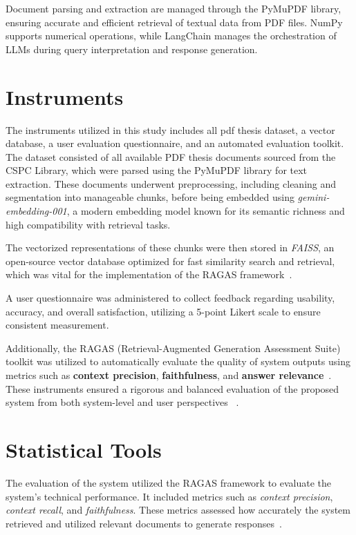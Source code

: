 \begin{refsection}
Document parsing and extraction are managed through the PyMuPDF library, ensuring accurate and efficient retrieval of textual data from PDF files. NumPy supports numerical operations, while LangChain manages the orchestration of LLMs during query interpretation and response generation.

\section{Instruments}


The instruments utilized in this study includes all pdf thesis dataset, a vector database, a user evaluation questionnaire, and an automated evaluation toolkit. The dataset consisted of all available PDF thesis documents sourced from the CSPC Library, which were parsed using the PyMuPDF library for text extraction. These documents underwent preprocessing, including cleaning and segmentation into manageable chunks, before being embedded using \textit{gemini-embedding-001}, a modern embedding model known for its semantic richness and high compatibility with retrieval tasks.


The vectorized representations of these chunks were then stored in \textit{FAISS}, an open-source vector database optimized for fast similarity search and retrieval, which was vital for the implementation of the RAGAS framework~\cite{trychroma2023chroma}.

A user questionnaire was administered to collect feedback regarding usability, accuracy, and overall satisfaction, utilizing a 5-point Likert scale to ensure consistent measurement.

Additionally, the RAGAS (Retrieval-Augmented Generation Assessment Suite) toolkit was utilized to automatically evaluate the quality of system outputs using metrics such as \textbf{context precision}, \textbf{faithfulness}, and \textbf{answer relevance}~\cite{shinn2023ragas}. These instruments ensured a rigorous and balanced evaluation of the proposed system from both system-level and user perspectives~ \cite{lin2021bert}.

\section{Statistical Tools}

The evaluation of the system utilized the RAGAS framework to evaluate the system's technical performance. It included metrics such as \textit{context precision}, \textit{context recall}, and \textit{faithfulness}. These metrics assessed how accurately the system retrieved and utilized relevant documents to generate responses~\cite{holmes2023chatbot, ameli2024ranking, lin2024satisfaction}.


\end{refsection}
